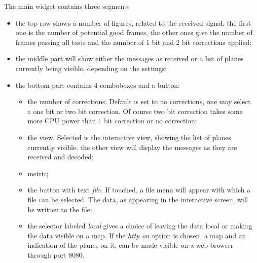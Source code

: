 \documentclass[11pt]{article}
\begin{document}
The main widget contains three segments
\begin{itemize}
\item
the top row shows a number of figures, related to the received signal,
the first one is the number of potential good frames, the other ones
give the number of frames passing all tests and the number of 1 bit and
2 bit corrections applied;
\item the middle part will show either the messages as received or
a list of planes currently being visible, depending on the settings;
\item the bottom part contains 4 comboboxes and a button:
\begin{itemize}
\item the number of corrections. Default is set to no corrections,
one may select a one bit or two bit correction. Of course two bit correction takes some more CPU power than 1 bit correction or no correction;
\item the view. Selected is the interactive view, showing the list of planes
currently visible, the other view will display the messages as they are 
received and decoded;
\item metric;
\item the button with text {\em file}. If touched, a file menu will appear
with which a file can be selected. The data, as appearing in the interactive
screen, will be written to the file;
\item the selector labeled {\em local} gives a choice of leaving the
data local or making the data visible on a map.
If the {\em http on} option is chosen, a map and an indication
of the planes on it, can be made visible on a web browser through port 8080.
\end{itemize}
\end{itemize}
\end{document}
